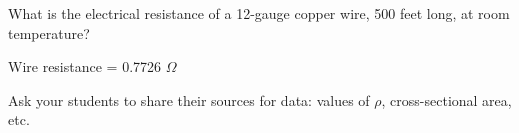 

What is the electrical resistance of a 12-gauge copper wire, 500 feet long, at room temperature?







Wire resistance = 0.7726 $\Omega$







Ask your students to share their sources for data: values of $\rho$, cross-sectional area, etc.





